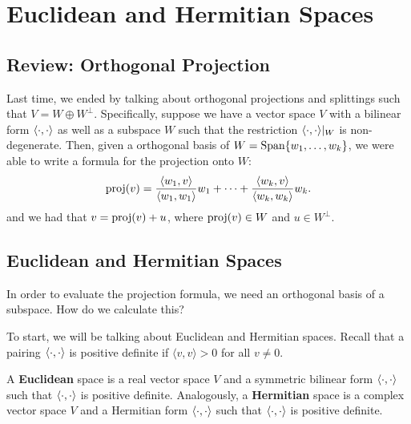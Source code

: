 
\section{Euclidean and Hermitian Spaces}

\subsection{Review: Orthogonal Projection}
Last time, we ended by talking about orthogonal projections and splittings such that $V = W \oplus W^\perp$.
Specifically, suppose we have a vector space $V$ with a bilinear form $\langle \cdot, \cdot \rangle$ as well as a subspace $W$ such that the restriction $\langle \cdot, \cdot \rangle|_W$ is non-degenerate.
Then, given a orthogonal basis of $W = \text{Span} \{ w_1, \ldots, w_k\}$, we were able to write a formula for the projection onto $W$:
\[\operatorname{proj}(v) = \frac{\langle w_1, v \rangle}{\langle w_1, w_1 \rangle } w_1 + \cdots + \frac{\langle w_k , v \rangle}{\langle w_k, w_k \rangle} w_k.\]
and we had that $v = \operatorname{proj}(v) + u$, where $\operatorname{proj}(v) \in W$ and $u \in W^\perp$. 

\subsection{Euclidean and Hermitian Spaces}
In order to evaluate the projection formula, we need an orthogonal basis of a subspace. How do we calculate this?

To start, we will be talking about Euclidean and Hermitian spaces. Recall that a pairing $\langle \cdot, \cdot \rangle$ is positive definite if $\langle v, v \rangle >0$ for all $v \neq 0.$
\begin{definition}
A \textbf{Euclidean} space is a real vector space $V$ and a symmetric bilinear form $\langle \cdot, \cdot \rangle$ such that $\langle \cdot, \cdot \rangle$ is positive definite. Analogously, a \textbf{Hermitian} space is a complex vector space $V$ and a Hermitian form $\langle \cdot, \cdot \rangle$ such that $\langle \cdot, \cdot \rangle$ is positive definite.
\end{definition}


